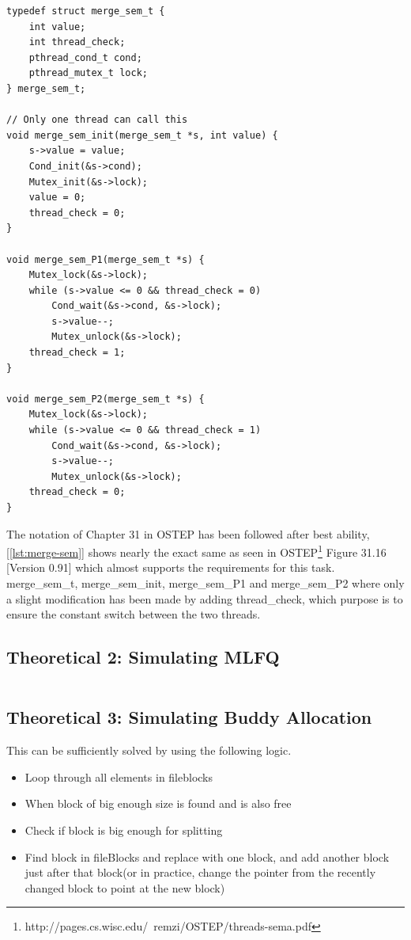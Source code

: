 \documentclass[11pt,a4paper]{article}
\theoremstyle{plain}
\theoremstyle{definition}
\theoremstyle{remark}
\numberwithin{equation}{section}
\begin{document}
\begin{lstlisting}[caption={Pseudo Code},label={lst:merge-sem}]
typedef struct merge_sem_t {
    int value;
    int thread_check;
    pthread_cond_t cond;
    pthread_mutex_t lock;
} merge_sem_t;

// Only one thread can call this
void merge_sem_init(merge_sem_t *s, int value) {
    s->value = value;
    Cond_init(&s->cond);
    Mutex_init(&s->lock);
    value = 0;
    thread_check = 0;
}

void merge_sem_P1(merge_sem_t *s) {
    Mutex_lock(&s->lock);
    while (s->value <= 0 && thread_check = 0)
        Cond_wait(&s->cond, &s->lock);
        s->value--;
        Mutex_unlock(&s->lock);
    thread_check = 1;
}

void merge_sem_P2(merge_sem_t *s) {
    Mutex_lock(&s->lock);
    while (s->value <= 0 && thread_check = 1)
        Cond_wait(&s->cond, &s->lock);
        s->value--;
        Mutex_unlock(&s->lock);
    thread_check = 0;
}
\end{lstlisting}

The notation of Chapter 31 in OSTEP has been followed after best ability, [\ref{lst:merge-sem}] shows nearly the exact same as seen in OSTEP\footnote{http://pages.cs.wisc.edu/~remzi/OSTEP/threads-sema.pdf} Figure 31.16 [Version 0.91] which almost supports the requirements for this task. merge\_sem\_t, merge\_sem\_init, merge\_sem\_P1 and merge\_sem\_P2 where only a slight modification has been made by adding thread\_check, which purpose is to ensure the constant switch between the two threads.


\subsection*{Theoretical 2: Simulating MLFQ}

\begin{lstlisting}[caption={MLFQ Pseudo Code},label={lst:mlfq}]

\end{lstlisting}


\subsection*{Theoretical 3: Simulating Buddy Allocation}

This can be sufficiently solved by using the following logic.

\begin{itemize}
\item Loop through all elements in fileblocks
\item When block of big enough size is found and is also free
\item Check if block is big enough for splitting
\item Find block in fileBlocks and replace with one block, and add another block just after that block(or in practice, change the pointer from the recently changed block to point at the new block)
\end{itemize}
\end{document}
